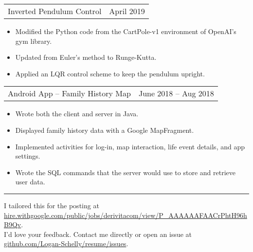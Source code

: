 \documentclass{article}
\newenvironment{compactItemize}{
  \begin{itemize}[itemsep=0ex, parsep=0ex, partopsep=0ex, topsep= -7pt]
}{
  \end{itemize}
}
\newcommand{\project}[2]{
  \begingroup
  \setlength{\tabcolsep}{0ex}
  \begin{tabularx}{\linewidth}{X r}
    #1 & %
    #2\\ %
  \end{tabularx}%
  \endgroup%
}
\begin{document}
\project{Inverted Pendulum Control}{April 2019}
\begin{compactItemize}
  \item Modified the Python code from the CartPole-v1 environment of OpenAI's gym library.
  \item Updated from Euler's method to Runge-Kutta.
  \item Applied an LQR control scheme to keep the pendulum upright.
\end{compactItemize}
\medskip

\project{Android App -- Family History Map}{June 2018 -- Aug 2018}
\begin{compactItemize}
  \item Wrote both the client and server in Java.
  \item Displayed family history data with a Google MapFragment.
  \item Implemented activities for log-in, map interaction, life event details, and app settings.
  \item Wrote the SQL commands that the server would use to store and retrieve user data.
\end{compactItemize}

\vfill
\hrule
\begin{center}
  I tailored this for the posting at \href{https://hire.withgoogle.com/public/jobs/derivitacom/view/P_AAAAAAFAACrPhtH96hB9Qv}{hire.withgoogle.com/public/jobs/derivitacom/view/P\_AAAAAAFAACrPhtH96hB9Qv}.\\
  I'd love your feedback.  Contact me directly or open an issue at \href{https://github.com/Logan-Schelly/resume/issues}{github.com/Logan-Schelly/resume/issues}.
\end{center}
\end{document}
